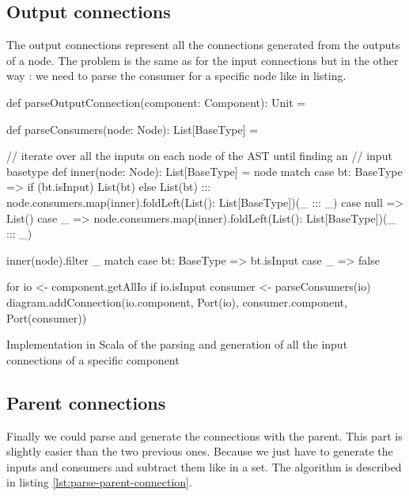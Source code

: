 \subsection{Output connections}
\label{sec:output-connections}

The output connections represent all the connections generated from the outputs
of a node. The problem is the same as for the input connections but in the other
way : we need to parse the consumer for a specific node like in listing.

\begin{listing}[H]
  \centering
  \begin{scalacode}
  def parseOutputConnection(component: Component): Unit = {
      
    def parseConsumers(node: Node): List[BaseType] = {
      
      // iterate over all the inputs on each node of the AST until finding an
      // input basetype
      def inner(node: Node): List[BaseType] = node match {
        case bt: BaseType =>
          if (bt.isInput) List(bt)
          else List(bt) ::: node.consumers.map(inner).foldLeft(List(): List[BaseType])(_ ::: _)
        case null => List()
        case _ => node.consumers.map(inner).foldLeft(List(): List[BaseType])(_ ::: _)
      }

      inner(node).filter {
        _ match {
          case bt: BaseType => bt.isInput
          case _ => false
        }
      }
    }

    for {
      io <- component.getAllIo
      if io.isInput
      consumer <- parseConsumers(io)
    } {
      diagram.addConnection(io.component, Port(io), consumer.component, Port(consumer))
    }
  }
  \end{scalacode}
  \caption[Parsing and generation of the outputs connections]{Implementation in
    Scala of the parsing and generation of all the input connections of a
    specific component}
  \label{lst:parse-output-connection-scala}
\end{listing}

\subsection{Parent connections}
\label{sec:parent-connections}

Finally we could parse and generate the connections with the parent. This part
is slightly easier than the two previous ones. Because we just have to generate
the inputs and consumers and subtract them like in a set. The algorithm is
described in listing \ref{lst:parse-parent-connection}.

